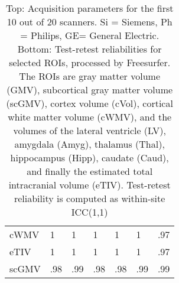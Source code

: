 \begin{table}
\begin{tabular}{lllllll}
cWMV                  &                 1   &                 1   &               1   &                1   &                1   &                .97 \\
eTIV                  &                 1   &                 1   &               1   &                1   &                1   &                .97 \\
scGMV                 &                 .98 &                 .99 &               .98 &                .98 &                .99 &                .99 \\
\bottomrule
\end{tabular}
\caption{Top: Acquisition parameters for the first 10 out of 20 scanners. Si = Siemens, Ph = Philips, GE= General Electric. Bottom: Test-retest reliabilities for selected ROIs, processed by Freesurfer. The ROIs are gray matter volume (GMV), subcortical gray matter volume (scGMV), cortex volume (cVol), cortical white matter volume (cWMV), and the volumes of the lateral ventricle (LV), amygdala (Amyg), thalamus (Thal), hippocampus (Hipp), caudate (Caud), and finally the estimated total intracranial volume (eTIV). Test-retest reliability is computed as within-site ICC(1,1)} 
\label{tab:acquisition1}

\end{table}